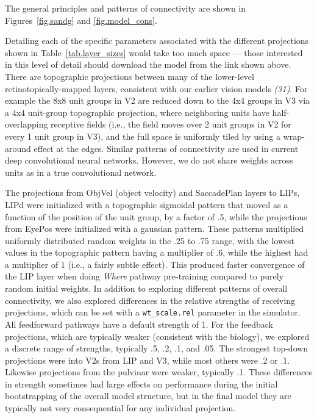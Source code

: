 \documentclass[12pt,twoside]{article}
\newif\myifpdf
\begin{document}
The general principles and patterns of connectivity are shown in Figures~\ref{fig.sandg} and \ref{fig.model_cons}.

Detailing each of the specific parameters associated with the different projections shown in Table~\ref{tab.layer_sizes} would take too much space --- those interested in this level of detail should download the model from the link shown above.  There are topographic projections between many of the lower-level retinotopically-mapped layers, consistent with our earlier vision models %
{\em (31)}.  For example the 8x8 unit groups in V2 are reduced down to the 4x4 groups in V3 via a 4x4 unit-group topographic projection, where neighboring units have half-overlapping receptive fields (i.e., the field moves over 2 unit groups in V2 for every 1 unit group in V3), and the full space is uniformly tiled by using a wrap-around effect at the edges.  Similar patterns of connectivity are used in current deep convolutional neural networks.  However, we do not share weights across units as in a true convolutional network.

The projections from ObjVel (object velocity) and SaccadePlan layers to LIPs, LIPd were initialized with a topographic sigmoidal pattern that moved as a function of the position of the unit group, by a factor of .5, while the projections from EyePos were initialized with a gaussian pattern.  These patterns multiplied uniformly distributed random weights in the .25 to .75 range, with the lowest values in the topographic pattern having a multiplier of .6, while the highest had a multiplier of 1 (i.e., a fairly subtle effect).  This produced faster convergence of the LIP layer when doing {\em Where} pathway pre-training compared to purely random initial weights.  In addition to exploring different patterns of overall connectivity, we also explored differences in the relative strengths of receiving projections, which can be set with a \texttt{wt\_scale.rel} parameter in the simulator.  All feedforward pathways have a default strength of 1.  For the feedback projections, which are typically weaker (consistent with the biology), we explored a discrete range of strengths, typically .5, .2, .1, and .05.  The strongest top-down projections were into V2s from LIP and V3, while most others were .2 or .1.  Likewise projections from the pulvinar were weaker, typically .1.  These differences in strength sometimes had large effects on performance during the initial bootstrapping of the overall model structure, but in the final model they are typically not very consequential for any individual projection.
\end{document}
